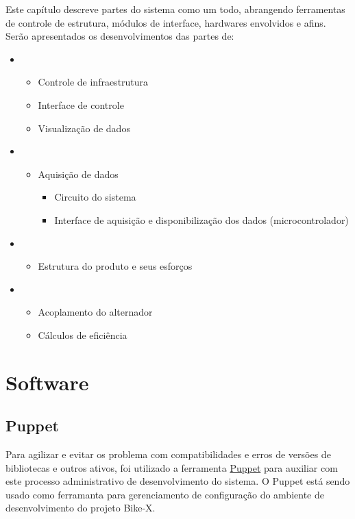 Este capítulo descreve partes do sistema como um todo, abrangendo ferramentas de controle de estrutura, módulos de interface, hardwares envolvidos e afins. Serão apresentados os desenvolvimentos das partes de:

\begin{itemize}
	\item {}
	\begin{itemize}
		\item Controle de infraestrutura
		\item Interface de controle
		\item Visualização de dados
	\end{itemize}
	\item {}
	\begin{itemize}
		\item Aquisição de dados
		\begin{itemize}
			\item Circuito do sistema
			\item Interface de aquisição e disponibilização dos dados (microcontrolador)
		\end{itemize}
	\end{itemize}
	\item {}
	\begin{itemize}
		\item Estrutura do produto e seus esforços
	\end{itemize}
	\item {}
	\begin{itemize}
		\item Acoplamento do alternador
		\item Cálculos de eficiência
	\end{itemize}
\end{itemize}


\chapter{Software}
\label{software}

\section{Puppet} %
\label{sec:puppet}

Para agilizar e evitar os problema com compatibilidades e erros de versões de bibliotecas e outros ativos, foi utilizado a ferramenta \href{http://puppetlabs.com}{Puppet} para auxiliar com este processo administrativo de desenvolvimento do sistema. O Puppet está sendo usado como ferramanta para gerenciamento de configuração do ambiente de desenvolvimento do projeto Bike-X.

